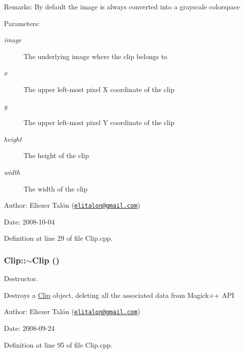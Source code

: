 \begin{Desc}
\item[Remarks:]By default the image is always converted into a grayscale colorspace\end{Desc}
\begin{Desc}
\item[Parameters:]
\begin{description}
\item[{\em image}]The underlying image where the clip belongs to \item[{\em x}]The upper left-most pixel X coordinate of the clip \item[{\em y}]The upper left-most pixel Y coordinate of the clip \item[{\em height}]The height of the clip \item[{\em width}]The width of the clip\end{description}
\end{Desc}
\begin{Desc}
\item[Author:]Eliezer Talón (\href{mailto:elitalon@gmail.com}{\tt elitalon@gmail.com}) \end{Desc}
\begin{Desc}
\item[Date:]2008-10-04 \end{Desc}


Definition at line 29 of file Clip.cpp.\hypertarget{class_clip_88647ed65e3482b5e0533ec98667b0fa}{
\subsubsection[$\sim$Clip]{\setlength{\rightskip}{0pt plus 5cm}Clip::$\sim$Clip ()}}
\label{class_clip_88647ed65e3482b5e0533ec98667b0fa}


Destructor. 

Destroys a \hyperlink{class_clip}{Clip} object, deleting all the associated data from Magick++ API

\begin{Desc}
\item[Author:]Eliezer Talón (\href{mailto:elitalon@gmail.com}{\tt elitalon@gmail.com}) \end{Desc}
\begin{Desc}
\item[Date:]2008-09-24 \end{Desc}


Definition at line 95 of file Clip.cpp.

